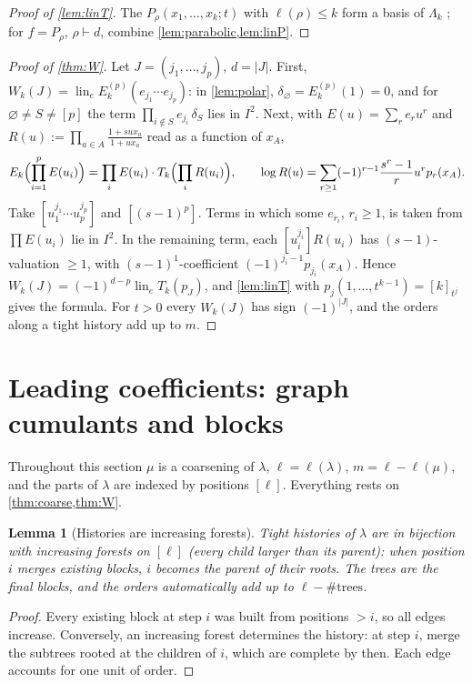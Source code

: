 \documentclass[11pt]{amsart}
\newtheorem{lemma}[theorem]{Lemma}
\theoremstyle{definition}
\theoremstyle{remark}
\numberwithin{equation}{section}
\newcommand{\lin}{\operatorname{lin}_e}
\newcommand{\Lam}{\Lambda}
\begin{document}
\begin{proof}[Proof of \cref{lem:linT}]
The $P_\rho(x_1,\dots,x_k;t)$ with $\ell(\rho)\le k$ form a basis of $\Lam_k$ \cite[III (2.7)]{Macdonald95}; for $f=P_\rho$, $\rho\vdash d$, combine \cref{lem:parabolic,lem:linP}.
\end{proof}

\begin{proof}[Proof of \cref{thm:W}]
Let $J=(j_1,\dots,j_p)$, $d=|J|$. First, $W_k(J)=\lin E_k^{(p)}(e_{j_1}\cdots e_{j_p})$: in \cref{lem:polar}, $\delta_\varnothing=E^{(p)}_k(1)=0$, and for $\varnothing\ne S\ne[p]$ the term $\prod_{i\notin S}e_{j_i}\,\delta_S$ lies in $I^2$. Next, with $E(u)=\sum_re_ru^r$ and $R(u):=\prod_{a\in A}\frac{1+sux_a}{1+ux_a}$ read as a function of $x_A$,
\[ E_k\Bigl(\prod_{i=1}^pE(u_i)\Bigr)=\prod_iE(u_i)\cdot T_k\Bigl(\prod_iR(u_i)\Bigr),\qquad \log R(u)=\sum_{r\ge1}(-1)^{r-1}\frac{s^r-1}{r}u^rp_r(x_A). \]
Take $[u_1^{j_1}\cdots u_p^{j_p}]$ and $[(s-1)^p]$. Terms in which some $e_{r_i}$, $r_i\ge1$, is taken from $\prod E(u_i)$ lie in $I^2$. In the remaining term, each $[u_i^{j_i}]R(u_i)$ has $(s-1)$-valuation $\ge1$, with $(s-1)^1$-coefficient $(-1)^{j_i-1}p_{j_i}(x_A)$. Hence $W_k(J)=(-1)^{d-p}\lin T_k(p_J)$, and \cref{lem:linT} with $p_j(1,\dots,t^{k-1})=[k]_{t^j}$ gives the formula. For $t>0$ every $W_k(J)$ has sign $(-1)^{|J|}$, and the orders along a tight history add up to $m$.
\end{proof}


\section{Leading coefficients: graph cumulants and blocks}\label{sec:leads}
Throughout this section $\mu$ is a coarsening of $\lambda$, $\ell=\ell(\lambda)$, $m=\ell-\ell(\mu)$, and the parts of $\lambda$ are indexed by positions $[\ell]$. Everything rests on \cref{thm:coarse,thm:W}.

\begin{lemma}[Histories are increasing forests]\label{lem:forest}
Tight histories of $\lambda$ are in bijection with increasing forests on $[\ell]$ (every child larger than its parent): when position $i$ merges existing blocks, $i$ becomes the parent of their roots. The trees are the final blocks, and the orders automatically add up to $\ell-\#\text{trees}$.
\end{lemma}
\begin{proof}
Every existing block at step $i$ was built from positions $>i$, so all edges increase. Conversely, an increasing forest determines the history: at step $i$, merge the subtrees rooted at the children of $i$, which are complete by then. Each edge accounts for one unit of order.
\end{proof}
\end{document}
